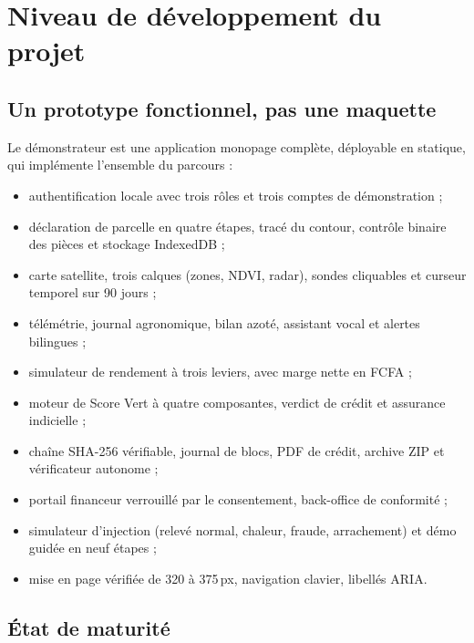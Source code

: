 \documentclass[12pt, a4paper]{article}
\begin{document}
\newpage
\section{Niveau de développement du projet}

\subsection{Un prototype fonctionnel, pas une maquette}

Le démonstrateur est une application monopage complète, déployable en statique, qui
implémente l'ensemble du parcours :

\begin{itemize}
  \item authentification locale avec trois rôles et trois comptes de démonstration ;
  \item déclaration de parcelle en quatre étapes, tracé du contour, contrôle binaire des
        pièces et stockage IndexedDB ;
  \item carte satellite, trois calques (zones, NDVI, radar), sondes cliquables et curseur
        temporel sur 90 jours ;
  \item télémétrie, journal agronomique, bilan azoté, assistant vocal et alertes bilingues ;
  \item simulateur de rendement à trois leviers, avec marge nette en FCFA ;
  \item moteur de Score Vert à quatre composantes, verdict de crédit et assurance indicielle ;
  \item chaîne SHA-256 vérifiable, journal de blocs, PDF de crédit, archive ZIP et
        vérificateur autonome ;
  \item portail financeur verrouillé par le consentement, back-office de conformité ;
  \item simulateur d'injection (relevé normal, chaleur, fraude, arrachement) et démo guidée
        en neuf étapes ;
  \item mise en page vérifiée de 320 à 375\,px, navigation clavier, libellés ARIA.
\end{itemize}

\subsection{État de maturité}
\end{document}
